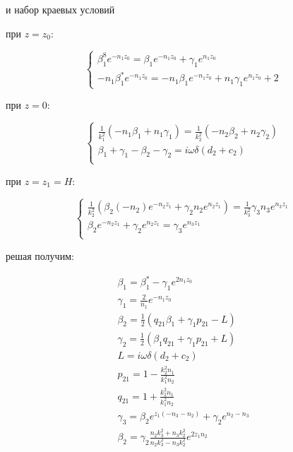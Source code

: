 	и набор краевых условий
	\newline
	
	
	при $z = z_0$:
	
	\begin{equation}
		\begin{cases}
			\beta_1^8 e^{-n_1 z_0} = \beta_1 e^{-n_1 z_0} + \gamma_1 e^{n_1 z_0} \\
			
			-n_1 \beta_1^* e^{-n_1 z_0} = -n_1 \beta_1 e^{-n_1 z_0} + n_1 \gamma_1 e^{n_1 z_0} + 2
		\end{cases}
	\end{equation}
	
	
	при $z = 0$:
	
	\begin{equation}
		\begin{cases}
			\frac{1}{k_1^2} (-n_1 \beta_1 + n_1 \gamma_1) = \frac{1}{k_2^2} (-n_2 \beta_2 + n_2 \gamma_2) \\
			
			\beta_1 + \gamma_1 - \beta_2 - \gamma_2 = i  \omega \delta (d_2 + c_2) \\
			
		\end{cases}	
	\end{equation}
	
	
	при $z = z_1 = H$:
	
	\begin{equation}
		\begin{cases}
			\frac{1}{k_2^2}(\beta_2 (-n_2) e^{-n_2 z_1} + \gamma_2 n_2 e^{n_2 z_1}) = \frac{1}{k_3^2}\gamma_3 n_3 e^{n_3 z_1} \\
			
		\beta_2 e^{-n_2 z_1} + \gamma_2 e^{n_2 z_1} = \gamma_3 e^{n_3 z_1} \\
		\end{cases}
	\end{equation}
	
	
	решая получим:
	
	\begin{equation}
		\begin{aligned}
			\beta_1 = \beta_1^* - \gamma_1 e^{2 n_1 z_0} \\
			\gamma_1 = \frac{2}{n_1} e^{-n_1 z_0} \\
			\beta_2 = \frac{1}{2} (q_{21} \beta_1 + \gamma_1 p_{21} - L) \\
			\gamma_2 = \frac{1}{2} (\beta_1 q_{21} + \gamma_1 p_{21} + L) \\
			L = i \omega \delta (d_2 + c_2) \\
			p_{21} = 1 - \frac{k_2^2 n_1}{k_1^2 n_2} \\
			q_{21} = 1 + \frac{k_2^2 n_1}{k_1^2 n_2} \\
			\gamma_3 = \beta_2 e^{z_1 (-n_3 - n_2)} + \gamma_2 e^{n_2 - n_3} \\
			\beta_2 = \gamma_2 \frac{n_2 k_3^2 + n_3 k_2^2}{n_2 k_3^2 - n_3 k_2^2} e^{2 z_1 n_2}  \\
		\end{aligned}
	\end{equation}
	
